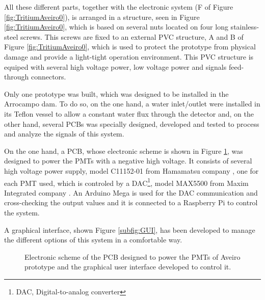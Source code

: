 All these different parts, together with the electronic system (F of Figure \ref{fig:TritiumAveiro0}), is arranged in a structure, seen in Figure \ref{fig:TritiumAveiro0}, which is based on several nuts located on four long stainless-steel screws. This screws are fixed to an external PVC structure, A and B of Figure \ref{fig:TritiumAveiro0}, which is used to protect the prototype from physical damage and provide a light-tight operation environment. This PVC structure is equiped with several high voltage power, low voltage power and signals feed-through connectors.

Only one prototype was built, which was designed to be installed in the Arrocampo dam. To do so, on the one hand, a water inlet/outlet were installed in its Teflon vessel to allow a constant water flux through the detector and, on the other hand, several PCBs was specially designed, developed and tested to process and analyze the signals of this system.

On the one hand, a PCB, whose electronic scheme is shown in Figure \ref{fig:HVElectronicAveiro}, was designed to power the PMTs with a negative high voltage. It consists of several high voltage power supply, model C11152-01 from Hamamatsu company \cite{PowerSupplyAveiroDataSheet}, one for each PMT used, which is controled by a DAC\footnote{DAC, Digital-to-analog converter}, model MAX5500 from Maxim Integrated company \cite{MAX5500DataSheet}. An Arduino Mega is used for the DAC communication and cross-checking the output values and it is connected to a Raspberry Pi to control the system.

A graphical interface, shown Figure \ref{subfig:GUI}, has been developed to manage the different options of this system in a comfortable way.

\begin{figure}[h]
 \centering
 \caption{Electronic scheme of the PCB designed to power the PMTs of Aveiro prototype and the graphical user interface developed to control it.}
 \label{fig:HVElectronicAveiro}
\end{figure}

